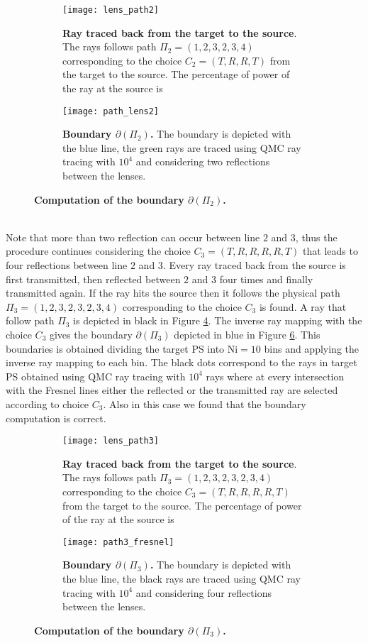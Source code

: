 \begin{figure}[t]
\centering
\begin{subfigure}[t]{.45\textwidth}
  \texttt{[image: lens\_path2]}
 \caption{\textbf{Ray traced back from the target to the source}. The rays follows path $\Pi_2 = (1,2,3,2,3,4)$ corresponding to the choice $C_2=(T,R,R,T)$ from the target to the source. The percentage of power of the ray at the source is }
  \label{fig:ray_path2}
\end{subfigure}%
\hfill
\begin{subfigure}[t]{.45\textwidth}
  \texttt{[image: path\_lens2]}
  \caption{\textbf{Boundary $\partial$$(\Pi_2)$.} The boundary is depicted with the blue line, the green rays are traced using QMC ray tracing with $10^4$ and considering two reflections between the lenses.} %
  \label{fig:boundary_path2}
\end{subfigure} %
\caption{\textbf{Computation of the boundary $\partial$$(\Pi_2)$.}}
\end{figure}
\\ \indent Note that more than two reflection can occur between line $2$ and $3$, thus the procedure continues considering the choice $C_3 = (T,R,R,R,R,T)$ that leads to four reflections between line $2$ and $3$. Every ray traced back from the source is first transmitted, then reflected between $2$ and $3$ four times and finally transmitted again. If the ray hits the source then it follows the physical path $\Pi_{3} = (1,2,3,2,3,2,3,4)$ corresponding to the choice $C_3$ is found. A ray that follow path $\Pi_3$ is depicted in black in Figure \ref{fig:ray_path3}. The inverse ray mapping with the choice $C_3$ gives the boundary $\partial$$(\Pi_3)$ depicted in blue in Figure \ref{fig:boundary_path3}. This boundaries is obtained dividing the target PS into $\textrm{Ni}=10$ bins and applying the inverse ray mapping to each bin. The black dots correspond to the rays in target PS obtained using QMC ray tracing with $10^4$ rays where at every intersection with the Fresnel lines either the reflected or the transmitted ray are selected according to choice $C_3$. Also in this case we found that the boundary computation is correct.
\begin{figure}[t]
\centering
\begin{subfigure}[t]{.45\textwidth}
  \texttt{[image: lens\_path3]}
 \caption{\textbf{Ray traced back from the target to the source}. The rays follows path $\Pi_3 = (1,2,3,2,3,2,3,4)$ corresponding to the choice $C_3=(T,R,R,R,R,T)$ from the target to the source. The percentage of power of the ray at the source is}
  \label{fig:ray_path3}
\end{subfigure}%
\hfill
\begin{subfigure}[t]{.45\textwidth}
  \texttt{[image: path3\_fresnel]}
  \caption{\textbf{Boundary $\partial$$(\Pi_3)$.} The boundary is depicted with the blue line, the black rays are traced using QMC ray tracing with $10^4$ and considering four reflections between the lenses.} %
  \label{fig:boundary_path3}
\end{subfigure} %
\caption{\textbf{Computation of the boundary $\partial$$(\Pi_3)$.}}
\end{figure}
